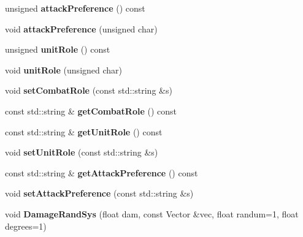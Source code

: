 \begin{DoxyCompactItemize}
\item 
unsigned {\bfseries attack\+Preference} () const \hypertarget{classUnit_ab9b5697b8962a2588a62c1ca1dcf2382}{}\label{classUnit_ab9b5697b8962a2588a62c1ca1dcf2382}

\item 
void {\bfseries attack\+Preference} (unsigned char)\hypertarget{classUnit_a53a9bdb6835eb2b1fde3e9b80165d27d}{}\label{classUnit_a53a9bdb6835eb2b1fde3e9b80165d27d}

\item 
unsigned {\bfseries unit\+Role} () const \hypertarget{classUnit_ae8ee972f7bbac710eef0264120bc11e4}{}\label{classUnit_ae8ee972f7bbac710eef0264120bc11e4}

\item 
void {\bfseries unit\+Role} (unsigned char)\hypertarget{classUnit_a412603691b6e5bdd66893d46b4bcf024}{}\label{classUnit_a412603691b6e5bdd66893d46b4bcf024}

\item 
void {\bfseries set\+Combat\+Role} (const std\+::string \&s)\hypertarget{classUnit_a3a7a7d4346c801cffd605216e56477e1}{}\label{classUnit_a3a7a7d4346c801cffd605216e56477e1}

\item 
const std\+::string \& {\bfseries get\+Combat\+Role} () const \hypertarget{classUnit_a14e0ee777327696a61daa6f85097c6ed}{}\label{classUnit_a14e0ee777327696a61daa6f85097c6ed}

\item 
const std\+::string \& {\bfseries get\+Unit\+Role} () const \hypertarget{classUnit_a87b7540db9f281bc0f050ded428b100c}{}\label{classUnit_a87b7540db9f281bc0f050ded428b100c}

\item 
void {\bfseries set\+Unit\+Role} (const std\+::string \&s)\hypertarget{classUnit_a45fb5e1d097eee1a1b6fb241669a9a6d}{}\label{classUnit_a45fb5e1d097eee1a1b6fb241669a9a6d}

\item 
const std\+::string \& {\bfseries get\+Attack\+Preference} () const \hypertarget{classUnit_ab766e48db8482ef23d56b4d17b1f3426}{}\label{classUnit_ab766e48db8482ef23d56b4d17b1f3426}

\item 
void {\bfseries set\+Attack\+Preference} (const std\+::string \&s)\hypertarget{classUnit_af1437b0e8ed4c84baae25b5f84f71a69}{}\label{classUnit_af1437b0e8ed4c84baae25b5f84f71a69}

\item 
void {\bfseries Damage\+Rand\+Sys} (float dam, const Vector \&vec, float randum=1, float degrees=1)\hypertarget{classUnit_afb7a9739b799e74c560ff14e336f6be9}{}\label{classUnit_afb7a9739b799e74c560ff14e336f6be9}


\end{DoxyCompactItemize}
